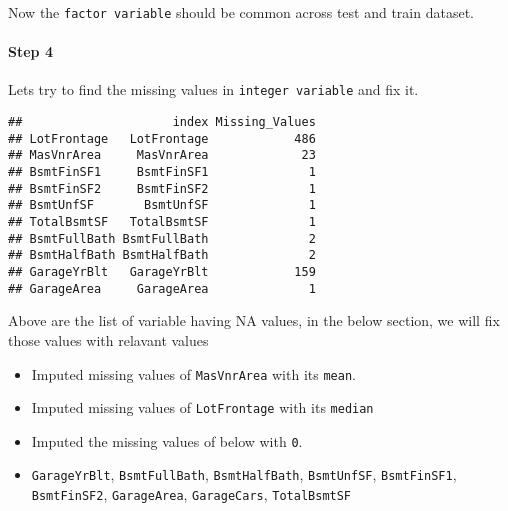 \documentclass[]{article}
\newenvironment{Shaded}{\begin{snugshade}}{\end{snugshade}}
\newcommand{\KeywordTok}[1]{\textcolor[rgb]{0.13,0.29,0.53}{\textbf{#1}}}
\newcommand{\DataTypeTok}[1]{\textcolor[rgb]{0.13,0.29,0.53}{#1}}
\newcommand{\DecValTok}[1]{\textcolor[rgb]{0.00,0.00,0.81}{#1}}
\newcommand{\StringTok}[1]{\textcolor[rgb]{0.31,0.60,0.02}{#1}}
\newcommand{\ControlFlowTok}[1]{\textcolor[rgb]{0.13,0.29,0.53}{\textbf{#1}}}
\newcommand{\OperatorTok}[1]{\textcolor[rgb]{0.81,0.36,0.00}{\textbf{#1}}}
\newcommand{\NormalTok}[1]{#1}
\let\oldparagraph\paragraph
\renewcommand{\paragraph}[1]{\oldparagraph{#1}\mbox{}}
\begin{document}
Now the \texttt{factor\ variable} should be common across test and train
dataset.

\paragraph{Step 4}\label{step-4}

Lets try to find the missing values in \texttt{integer\ variable} and
fix it.

\begin{Shaded}
\end{Shaded}

\begin{verbatim}
##                     index Missing_Values
## LotFrontage   LotFrontage            486
## MasVnrArea     MasVnrArea             23
## BsmtFinSF1     BsmtFinSF1              1
## BsmtFinSF2     BsmtFinSF2              1
## BsmtUnfSF       BsmtUnfSF              1
## TotalBsmtSF   TotalBsmtSF              1
## BsmtFullBath BsmtFullBath              2
## BsmtHalfBath BsmtHalfBath              2
## GarageYrBlt   GarageYrBlt            159
## GarageArea     GarageArea              1
\end{verbatim}

Above are the list of variable having NA values, in the below section,
we will fix those values with relavant values

\begin{itemize}
\item
  Imputed missing values of \texttt{MasVnrArea} with its \texttt{mean}.
\item
  Imputed missing values of \texttt{LotFrontage} with its
  \texttt{median}
\item
  Imputed the missing values of below with \texttt{0}.
\item
  \texttt{GarageYrBlt}, \texttt{BsmtFullBath}, \texttt{BsmtHalfBath},
  \texttt{BsmtUnfSF}, \texttt{BsmtFinSF1}, \texttt{BsmtFinSF2},
  \texttt{GarageArea}, \texttt{GarageCars}, \texttt{TotalBsmtSF}
\end{itemize}
\end{document}
